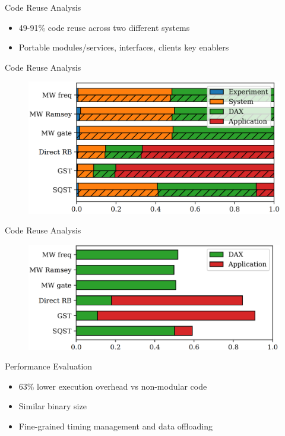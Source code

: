 \documentclass[18 pt]{beamer}
\begin{document}
\begin{frame}{Code Reuse Analysis}
  \begin{itemize}
  \item 49-91\% code reuse across two different systems
  \item Portable modules/services, interfaces, clients key enablers
  \end{itemize}
  \end{frame}
  
  \begin{frame}{Code Reuse Analysis}
    \begin{figure}
      \includegraphics[width=.8\textwidth]{fig6.png}
    \end{figure}
  \end{frame}
  \begin{frame}{Code Reuse Analysis}
    \begin{figure}
      \includegraphics[width=.8\textwidth]{fig7.png}
    \end{figure}
  \end{frame}
\begin{frame}{Performance Evaluation}
\begin{itemize}
\item 63\% lower execution overhead vs non-modular code
\item Similar binary size
\item Fine-grained timing management and data offloading
\end{itemize}
\end{frame}
\end{document}

